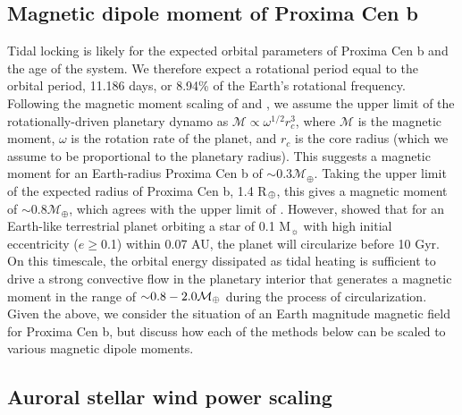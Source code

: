 \documentclass{emulateapj}
\newcommand{\XXX}[1]{#1}      %
\begin{document}
\subsection{Magnetic dipole moment of Proxima Cen b}
\label{sec:dipole_moment}
\XXX{Tidal locking is likely for the expected orbital parameters of Proxima Cen b and the age of the system. We therefore expect a rotational period equal to the orbital period, 11.186 days, or 8.94\% of the Earth's rotational frequency. Following the magnetic moment scaling of \citet{Stevenson1983} and \citet{Mizutani1992}, we assume the upper limit of the rotationally-driven planetary dynamo as $\mathcal{M} \propto \omega^{1/2} r_c^3$, where $\mathcal{M}$ is the magnetic moment, $\omega$ is the rotation rate of the planet, and $r_c$ is the core radius (which we assume to be proportional to the planetary radius). This suggests a magnetic moment for an Earth-radius Proxima Cen b of ${\sim}0.3 \mathcal{M}_{\oplus}$. Taking the upper limit of the expected radius of Proxima Cen b, 1.4 R$_{\oplus}$, this gives a magnetic moment of ${\sim}0.8 \mathcal{M}_{\oplus}$, which agrees with the upper limit of \citet{Zuluaga2016}. However, \citet{Driscoll2015} showed that for an Earth-like terrestrial planet orbiting a star of 0.1 M$_{\sun}$ with high initial eccentricity ($e\geq$0.1) within 0.07 AU, the planet will circularize before 10 Gyr. On this timescale, the orbital energy dissipated as tidal heating is sufficient to drive a strong convective flow in the planetary interior that generates a magnetic moment in the range of ${\sim}0.8-2.0 \mathcal{M}_{\oplus}$ during the process of circularization. Given the above, we consider the situation of an Earth magnitude magnetic field for Proxima Cen b, but discuss how each of the methods below can be scaled to various magnetic dipole moments.}

\subsection{Auroral stellar wind power scaling}
\label{sec:signal_m1}
\end{document}
